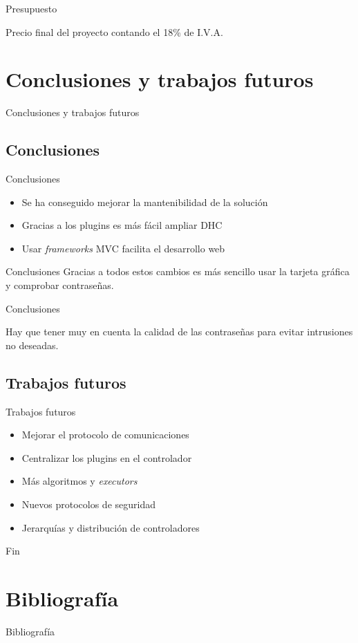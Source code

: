 \documentclass[12pt]{beamer}
\newcommand{\mysection}[1]{\begin{frame}{}\begin{center}\Huge #1\end{center}\end{frame}}
\begin{document}
\begin{frame}{Presupuesto}
	\begin{center}
		Precio final del proyecto contando el 18\% de I.V.A.
		\pause
		\only<2>{\Huge 43.785,30\euro}
	\end{center}
\end{frame}


\section{Conclusiones y trabajos futuros}
\mysection{Conclusiones y trabajos futuros}

\subsection{Conclusiones}
\begin{frame}{Conclusiones}
	\begin{itemize}
		\item Se ha conseguido mejorar la mantenibilidad de la solución
		\item Gracias a los plugins es más fácil ampliar DHC
		\item Usar \emph{frameworks} MVC facilita el desarrollo web
	\end{itemize}
\end{frame}

\begin{frame}{Conclusiones}
	Gracias a todos estos cambios es más sencillo usar la tarjeta gráfica y comprobar contraseñas.
\end{frame}

\begin{frame}{Conclusiones}
	\begin{center}
		Hay que tener muy en cuenta la calidad de las contraseñas para evitar intrusiones no deseadas.
	\end{center}
\end{frame}

\subsection{Trabajos futuros}
\begin{frame}{Trabajos futuros}
	\begin{itemize}
		\item Mejorar el protocolo de comunicaciones
		\item Centralizar los plugins en el controlador
		\item Más algoritmos y \emph{executors}
		\item Nuevos protocolos de seguridad
		\item Jerarquías y distribución de controladores
	\end{itemize}
\end{frame}

\begin{frame}
	\begin{center}
		\Huge Fin
	\end{center}
\end{frame}

\section{Bibliografía}
\begin{frame}[allowframebreaks]{Bibliografía}
	
	
\end{frame}
\end{document}
